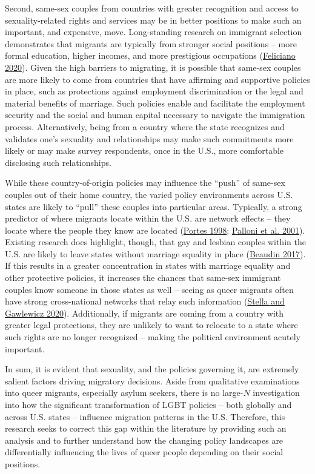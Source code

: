 \documentclass[
  11pt,
]{article}
\begin{document}
Second, same-sex couples from countries with greater recognition and access to sexuality-related rights and services may be in better positions to make such an important, and expensive, move. Long-standing research on immigrant selection demonstrates that migrants are typically from stronger social positions -- more formal education, higher incomes, and more prestigious occupations (\protect\hyperlink{ref-feliciano_2020}{Feliciano 2020}). Given the high barriers to migrating, it is possible that same-sex couples are more likely to come from countries that have affirming and supportive policies in place, such as protections against employment discrimination or the legal and material benefits of marriage. Such policies enable and facilitate the employment security and the social and human capital necessary to navigate the immigration process. Alternatively, being from a country where the state recognizes and validates one's sexuality and relationships may make such commitments more likely or may make survey respondents, once in the U.S., more comfortable disclosing such relationships.

While these country-of-origin policies may influence the ``push'' of same-sex couples out of their home country, the varied policy environments across U.S. states are likely to ``pull'' these couples into particular areas. Typically, a strong predictor of where migrants locate within the U.S. are network effects -- they locate where the people they know are located (\protect\hyperlink{ref-portes_1998}{Portes 1998}; \protect\hyperlink{ref-palloni_2001}{Palloni et al. 2001}). Existing research does highlight, though, that gay and lesbian couples within the U.S. are likely to leave states without marriage equality in place (\protect\hyperlink{ref-beaudin_2017}{Beaudin 2017}). If this results in a greater concentration in states with marriage equality and other protective policies, it increases the chances that same-sex immigrant couples know someone in those states as well -- seeing as queer migrants often have strong cross-national networks that relay such information (\protect\hyperlink{ref-stella_2020}{Stella and Gawlewicz 2020}). Additionally, if migrants are coming from a country with greater legal protections, they are unlikely to want to relocate to a state where such rights are no longer recognized -- making the political environment acutely important.

In sum, it is evident that sexuality, and the policies governing it, are extremely salient factors driving migratory decisions. Aside from qualitative examinations into queer migrants, especially asylum seekers, there is no large-\(N\) investigation into how the significant transformation of LGBT policies -- both globally and across U.S. states -- influence migration patterns in the U.S. Therefore, this research seeks to correct this gap within the literature by providing such an analysis and to further understand how the changing policy landscapes are differentially influencing the lives of queer people depending on their social positions.
\end{document}
